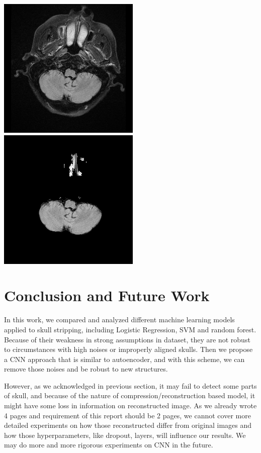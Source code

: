 \documentclass[conference]{IEEEtran}
\begin{document}
\hspace{8mm}
\includegraphics[scale = 0.3]{origin_2.png}
\hspace{22mm}
\includegraphics[scale = 0.3]{stripped_2.png}


\section{Conclusion and Future Work}
In this work, we compared and analyzed different machine learning models applied to skull stripping, including Logistic Regression, SVM and random forest. Because of their weakness in strong assumptions in dataset, they are not robust to circumstances with high noises or improperly aligned skulls. Then we propose a CNN approach that is similar to autoencoder, and with this scheme, we can remove those noises and be robust to new structures. 

However, as we acknowledged in previous section, it may fail to detect some parts of skull, and because of the nature of compression/reconstruction based model, it might have some loss in information on reconstructed image. As we already wrote 4 pages and requirement of this report should be 2 pages, we cannot cover more detailed experiments on how those reconstructed differ from original images and how those hyperparameters, like dropout, layers, will influence our results. We may do more and more rigorous experiments on CNN in the future. 
\end{document}
